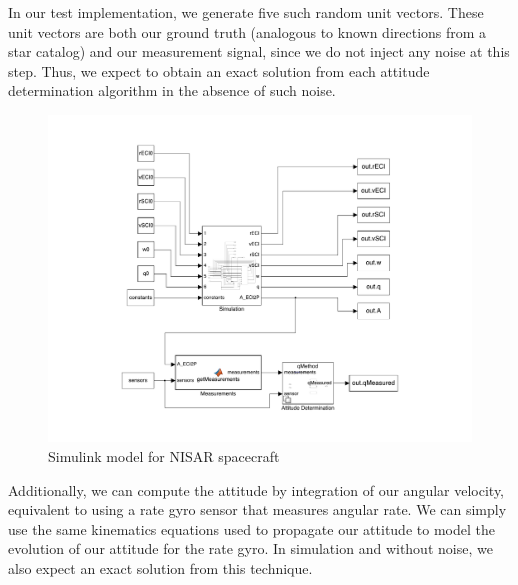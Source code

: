 In our test implementation, we generate five such random unit vectors. These unit vectors are both our ground truth (analogous to known directions from a star catalog) and our measurement signal, since we do not inject any noise at this step. Thus, we expect to obtain an exact solution from each attitude determination algorithm in the absence of such noise.

\begin{figure}[H]
\centering
\includegraphics[scale=0.55]{Images/ps6_problem4.pdf}
\caption{Simulink model for NISAR spacecraft}
\label{fig:Images/ps6_problem4}
\end{figure}

Additionally, we can compute the attitude by integration of our angular velocity, equivalent to using a rate gyro sensor that measures angular rate. We can simply use the same kinematics equations used to propagate our attitude to model the evolution of our attitude for the rate gyro. In simulation and without noise, we also expect an exact solution from this technique.

